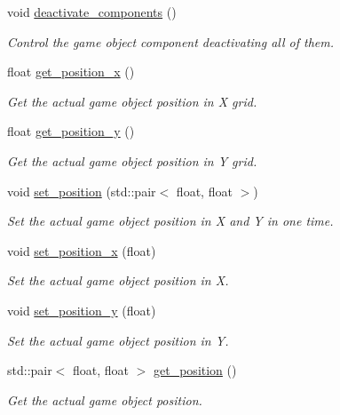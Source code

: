 \begin{DoxyCompactItemize}
void \hyperlink{classengine_1_1_game_object_a53ecb7384b8fcfe8b0d887603070d8b1}{deactivate\+\_\+components} ()
\begin{DoxyCompactList}\small\item\em Control the game object component deactivating all of them. \end{DoxyCompactList}\item 
float \hyperlink{classengine_1_1_game_object_a8897eb01abcb75b803977bd112586ca5}{get\+\_\+position\+\_\+x} ()
\begin{DoxyCompactList}\small\item\em Get the actual game object position in X grid. \end{DoxyCompactList}\item 
float \hyperlink{classengine_1_1_game_object_aebb20a31340dd04aae07079ddb63528d}{get\+\_\+position\+\_\+y} ()
\begin{DoxyCompactList}\small\item\em Get the actual game object position in Y grid. \end{DoxyCompactList}\item 
void \hyperlink{classengine_1_1_game_object_ada8fe8ebffd004fc9c37d3ea19b449ba}{set\+\_\+position} (std\+::pair$<$ float, float $>$)
\begin{DoxyCompactList}\small\item\em Set the actual game object position in X and Y in one time. \end{DoxyCompactList}\item 
void \hyperlink{classengine_1_1_game_object_acdb36a1aa18d98dc0d1d779b869c8e01}{set\+\_\+position\+\_\+x} (float)
\begin{DoxyCompactList}\small\item\em Set the actual game object position in X. \end{DoxyCompactList}\item 
void \hyperlink{classengine_1_1_game_object_af11340a490fa5df068c73dbd4b788b9c}{set\+\_\+position\+\_\+y} (float)
\begin{DoxyCompactList}\small\item\em Set the actual game object position in Y. \end{DoxyCompactList}\item 
std\+::pair$<$ float, float $>$ \hyperlink{classengine_1_1_game_object_a1b45a9a78d9d24bda7380a15645362f2}{get\+\_\+position} ()
\begin{DoxyCompactList}\small\item\em Get the actual game object position. \end{DoxyCompactList}\item 

\end{DoxyCompactItemize}
